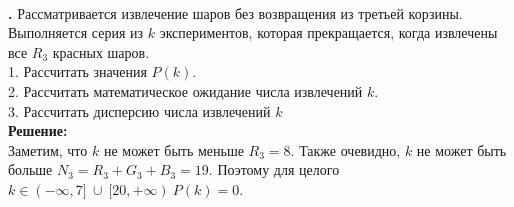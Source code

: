\documentclass{article}
\begin{document}
\\
\textbf {.} 
\large Рассматривается извлечение шаров без возвращения из третьей корзины. Выполняется серия из \begin{math}k\end{math} экспериментов, которая прекращается, когда извлечены все \begin{math}R_3\end{math} красных шаров.
\vspace{\baselineskip}
\\
\large 1. Рассчитать значения \begin{math}P(k)\end{math}.
\vspace{\baselineskip}
\\
\large 2. Рассчитать математическое ожидание числа извлечений \begin{math}k\end{math}.
\vspace{\baselineskip}
\\
\large 3. Рассчитать дисперсию числа извлечений \begin{math}k\end{math}
\vspace{\baselineskip}
\\
\textbf{Решение:}
\vspace{\baselineskip}
\\
Заметим, что \begin{math}k\end{math} не может быть меньше \begin{math}R_3 = 8\end{math}. Также очевидно, \begin{math}k\end{math} не может быть больше \begin{math}N_3 = R_3 + G_3 + B_3 = 19 \end{math}. Поэтому для целого \begin{math}k \in \left(-\infty, 7] \ \cup \ [20, +\infty \right) \  P(k) = 0\end{math}.
\end{document}

